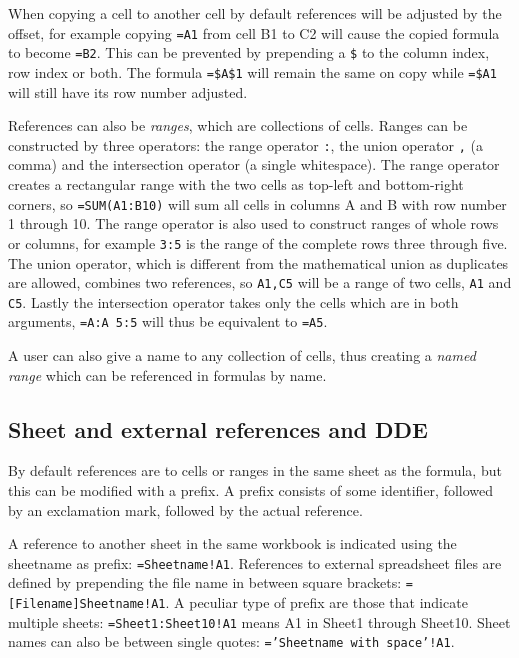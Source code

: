 \documentclass[conference]{IEEEtran}
\begin{document}
When copying a cell to another cell by default references will be adjusted by the offset, for example copying \texttt{=A1} from cell B1 to C2 will cause the copied formula to become \texttt{=B2}.
This can be prevented by prepending a \texttt{\$} to the column index, row index or both.
The formula \texttt{=\$A\$1} will remain the same on copy while \texttt{=\$A1} will still have its row number adjusted.

References can also be \emph{ranges}, which are collections of cells.
Ranges can be constructed by three operators: the range operator \texttt{:}, the union operator \texttt{,} (a comma) and the intersection operator \texttt{} (a single whitespace).
The range operator creates a rectangular range with the two cells as top-left and bottom-right corners, so \texttt{=SUM(A1:B10)} will sum all cells in columns A and B with row number 1 through 10.
The range operator is also used to construct ranges of whole rows or columns, for example \texttt{3:5} is the range of the complete rows three through five.
The union operator, which is different from the mathematical union as duplicates are allowed, combines two references, so \texttt{A1,C5} will be a range of two cells, \texttt{A1} and \texttt{C5}.
Lastly the intersection operator takes only the cells which are in both arguments, \texttt{=A:A 5:5} will thus be equivalent to \texttt{=A5}.

A user can also give a name to any collection of cells, thus creating a \emph{named range} which can be referenced in formulas by name.

\subsection{Sheet and external references and DDE}
\label{subsection:ExternalRefsDDE}

By default references are to cells or ranges in the same sheet as the formula, but this can be modified with a prefix. A prefix consists of some identifier, followed by an exclamation mark, followed by the actual reference.

A reference to another sheet in the same workbook is indicated using the sheetname as prefix: \texttt{=Sheetname!A1}. References to external spreadsheet files are defined by prepending the file name in between square brackets: \texttt{=[Filename]Sheetname!A1}.
A peculiar type of prefix are those that indicate multiple sheets: \texttt{=Sheet1:Sheet10!A1} means A1 in Sheet1 through Sheet10.
Sheet names can also be between single quotes: \texttt{='Sheetname with space'!A1}. 
\end{document}

